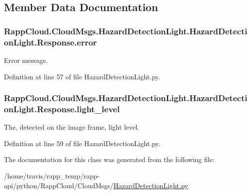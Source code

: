 \subsection{Member Data Documentation}
\hypertarget{classRappCloud_1_1CloudMsgs_1_1HazardDetectionLight_1_1HazardDetectionLight_1_1Response_a76a931e94a670d8218f0f5c7c8d65b25}{
\subsubsection[{error}]{\setlength{\rightskip}{0pt plus 5cm}Rapp\-Cloud.\-Cloud\-Msgs.\-Hazard\-Detection\-Light.\-Hazard\-Detection\-Light.\-Response.\-error}}\label{classRappCloud_1_1CloudMsgs_1_1HazardDetectionLight_1_1HazardDetectionLight_1_1Response_a76a931e94a670d8218f0f5c7c8d65b25}


Error message. 



Definition at line 57 of file Hazard\-Detection\-Light.\-py.

\hypertarget{classRappCloud_1_1CloudMsgs_1_1HazardDetectionLight_1_1HazardDetectionLight_1_1Response_a0fcc82151d8be5cbc7ca48fec93f4b97}{
\subsubsection[{light\-\_\-level}]{\setlength{\rightskip}{0pt plus 5cm}Rapp\-Cloud.\-Cloud\-Msgs.\-Hazard\-Detection\-Light.\-Hazard\-Detection\-Light.\-Response.\-light\-\_\-level}}\label{classRappCloud_1_1CloudMsgs_1_1HazardDetectionLight_1_1HazardDetectionLight_1_1Response_a0fcc82151d8be5cbc7ca48fec93f4b97}


The, detected on the image frame, light level. 



Definition at line 59 of file Hazard\-Detection\-Light.\-py.



The documentation for this class was generated from the following file\-:\begin{DoxyCompactItemize}
\item 
/home/travis/rapp\-\_\-temp/rapp-\/api/python/\-Rapp\-Cloud/\-Cloud\-Msgs/\hyperlink{HazardDetectionLight_8py}{Hazard\-Detection\-Light.\-py}\end{DoxyCompactItemize}
